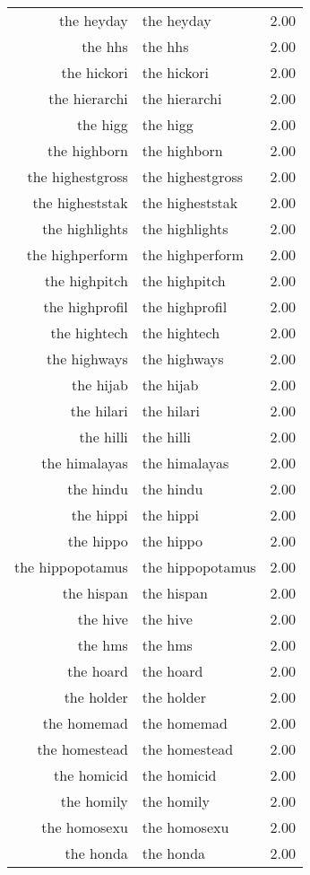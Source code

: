 \begin{table}[ht]
\begin{tabular}{rlr}
  the heyday & the heyday & 2.00 \\ 
  the hhs & the hhs & 2.00 \\ 
  the hickori & the hickori & 2.00 \\ 
  the hierarchi & the hierarchi & 2.00 \\ 
  the higg & the higg & 2.00 \\ 
  the highborn & the highborn & 2.00 \\ 
  the highestgross & the highestgross & 2.00 \\ 
  the higheststak & the higheststak & 2.00 \\ 
  the highlights & the highlights & 2.00 \\ 
  the highperform & the highperform & 2.00 \\ 
  the highpitch & the highpitch & 2.00 \\ 
  the highprofil & the highprofil & 2.00 \\ 
  the hightech & the hightech & 2.00 \\ 
  the highways & the highways & 2.00 \\ 
  the hijab & the hijab & 2.00 \\ 
  the hilari & the hilari & 2.00 \\ 
  the hilli & the hilli & 2.00 \\ 
  the himalayas & the himalayas & 2.00 \\ 
  the hindu & the hindu & 2.00 \\ 
  the hippi & the hippi & 2.00 \\ 
  the hippo & the hippo & 2.00 \\ 
  the hippopotamus & the hippopotamus & 2.00 \\ 
  the hispan & the hispan & 2.00 \\ 
  the hive & the hive & 2.00 \\ 
  the hms & the hms & 2.00 \\ 
  the hoard & the hoard & 2.00 \\ 
  the holder & the holder & 2.00 \\ 
  the homemad & the homemad & 2.00 \\ 
  the homestead & the homestead & 2.00 \\ 
  the homicid & the homicid & 2.00 \\ 
  the homily & the homily & 2.00 \\ 
  the homosexu & the homosexu & 2.00 \\ 
  the honda & the honda & 2.00 \\ 

\end{tabular}
\end{table}
